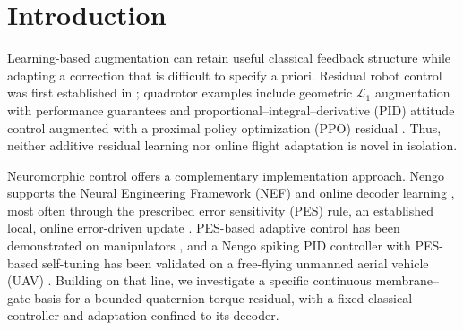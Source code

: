 \documentclass[letterpaper, 10 pt, conference]{ieeeconf}
\begin{document}
\section{Introduction}
Learning-based augmentation can retain useful classical feedback structure
while adapting a correction that is difficult to specify a priori.
Residual robot control was first established in \cite{johannink2019}; quadrotor
examples include geometric $\mathcal L_1$ augmentation with performance
guarantees \cite{wu2025l1quad} and proportional--integral--derivative (PID)
attitude control augmented with a proximal policy optimization (PPO) residual
\cite{li2027hpappo}. Thus, neither additive residual learning nor online
flight adaptation is novel in isolation.

Neuromorphic control offers a complementary implementation approach.
Nengo supports the Neural Engineering Framework (NEF) and online decoder
learning \cite{bekolay2014nengo}, most often through the prescribed error
sensitivity (PES) rule, an established local, online error-driven update
\cite{voelker2015pes}. PES-based adaptive control has been
demonstrated on manipulators \cite{dewolf2016arm,dewolf2020nengo}, and a
Nengo spiking PID controller with PES-based self-tuning has been validated
on a free-flying unmanned aerial vehicle (UAV) \cite{olivares2026selftuning}.
Building on that line, we
investigate a specific continuous membrane--gate basis for a bounded
quaternion-torque residual, with a fixed classical controller and adaptation
confined to its decoder.
\end{document}
